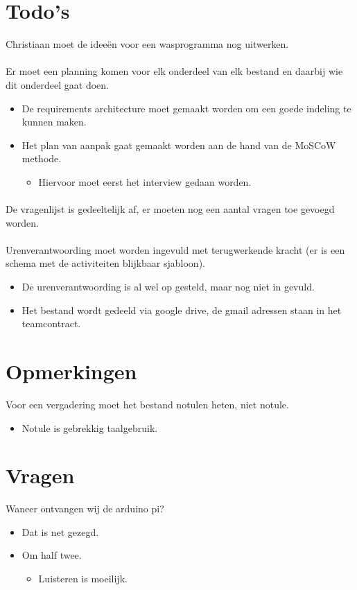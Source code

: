 \documentclass[dutch]{hu}
\begin{document}
	\section{Todo's}
	Christiaan moet de ideeën voor een wasprogramma nog uitwerken.
	\paragraph{}
	Er moet een planning komen voor elk onderdeel van elk bestand en daarbij wie dit onderdeel gaat doen.
	\begin{itemize}
		\item De requirements architecture moet gemaakt worden om een goede indeling te kunnen maken.
		\item Het plan van aanpak gaat gemaakt worden aan de hand van de MoSCoW methode.
		\begin{itemize}
			\item Hiervoor moet eerst het interview gedaan worden.
		\end{itemize}
	\end{itemize}
	\paragraph{}
	De vragenlijst is gedeeltelijk af, er moeten nog een aantal vragen toe gevoegd worden.
	\paragraph{}
	Urenverantwoording moet worden ingevuld met terugwerkende kracht (er is een schema met de activiteiten blijkbaar sjabloon).
	\begin{itemize}
		\item De urenverantwoording is al wel op gesteld, maar nog niet in gevuld.
		\item Het bestand wordt gedeeld via google drive, de gmail adressen staan in het teamcontract.
	\end{itemize}
	
	\section{Opmerkingen}
	Voor een vergadering moet het bestand notulen heten, niet notule.
	\begin{itemize}
		\item Notule is gebrekkig taalgebruik.
	\end{itemize}
	
	\section{Vragen}
	Waneer ontvangen wij de arduino pi?
	\begin{itemize}
		\item Dat is net gezegd.
		\item Om half twee.
		\begin{itemize}
			\item Luisteren is moeilijk.
		\end{itemize}
	\end{itemize}
	
\end{document}

